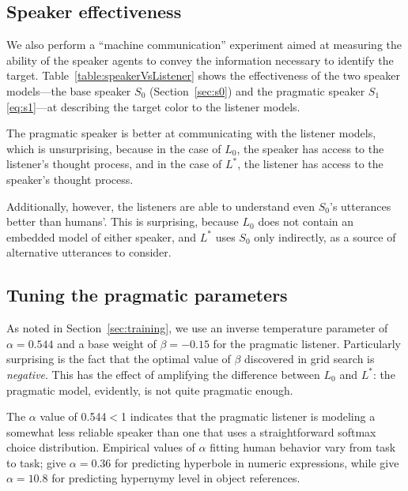 \documentclass[11pt,letterpaper]{article}
\newcommand{\Listener}{L}
\newcommand{\Speaker}{S}
\renewcommand{\|}{\mid}
\newcommand{\secref}[1]{Section~\ref{#1}}
\newcommand{\Tabref}[1]{Table~\ref{#1}}
\begin{document}
\subsection{Speaker effectiveness} \label{sec:speaker_eff}

We also perform a ``machine communication'' experiment aimed at measuring the
ability of the speaker agents to convey the information necessary to identify
the target. \Tabref{table:speakerVsListener} shows the effectiveness of the
two speaker models---the base speaker $\Speaker_0$ (\secref{sec:s0}) and the
pragmatic speaker $\Speaker_1$ \eqref{eq:s1}---at describing the
target color to the listener models.

The pragmatic speaker is better at communicating
with the listener models, which is unsurprising, because in the case of
$\Listener_0$, the speaker has access to the listener's thought process, and in
the case of $\Listener^*$, the listener has access to the speaker's thought process.

Additionally, however, the listeners are able to understand even $\Speaker_0$'s
utterances better than humans'. This is surprising, because $\Listener_0$ does not
contain an embedded model of either speaker, and $\Listener^*$ uses $\Speaker_0$
only indirectly, as a source of alternative utterances to consider.

\subsection{Tuning the pragmatic parameters} \label{sec:alpha_beta}

As noted in \secref{sec:training}, we use an inverse temperature parameter of
$\alpha = 0.544$ and a base weight of $\beta = -0.15$ for the pragmatic
listener. Particularly surprising is the fact that the optimal value of $\beta$
discovered in grid search is \emph{negative}. This has the effect of amplifying
the difference between $\Listener_0$ and $\Listener^*$: the pragmatic model,
evidently, is not quite pragmatic enough.

The $\alpha$ value of 0.544${}<{}$1 indicates that the pragmatic listener is
modeling a somewhat less reliable speaker than one that uses a straightforward
softmax choice distribution. Empirical values of $\alpha$ fitting human behavior
vary from task to task;  give $\alpha = 0.36$ for predicting
hyperbole in numeric expressions, while  give $\alpha = 10.8$ for
predicting hypernymy level in object references.
\end{document}
